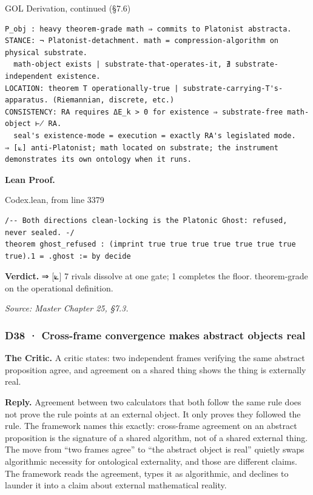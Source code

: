 \documentclass[10pt,twocolumn]{article}
\begin{document}
\begin{golbox}{GOL Derivation, continued (§7.6)}
\begin{lstlisting}[style=golv]
P_obj : heavy theorem-grade math ⇒ commits to Platonist abstracta.
STANCE: ¬ Platonist-detachment. math = compression-algorithm on physical substrate.
  math-object exists | substrate-that-operates-it, ∄ substrate-independent existence.
LOCATION: theorem T operationally-true | substrate-carrying-T's-apparatus. (Riemannian, discrete, etc.)
CONSISTENCY: RA requires ΔE_k > 0 for existence ⇒ substrate-free math-object ⊬ RA.
  seal's existence-mode = execution = exactly RA's legislated mode.
⇒ [⟀] anti-Platonist; math located on substrate; the instrument demonstrates its own ontology when it runs.
\end{lstlisting}
\end{golbox}

\textbf{Lean Proof.}

\begin{leanexcerpt}{Codex.lean, from line 3379}
\begin{lstlisting}[style=leanx,firstnumber=3379]
/-- Both directions clean-locking is the Platonic Ghost: refused, never sealed. -/
theorem ghost_refused : (imprint true true true true true true true true).1 = .ghost := by decide
\end{lstlisting}
\end{leanexcerpt}

\textbf{Verdict.} ⇒ {[}⟀{]} 7 rivals dissolve at one gate; 1 completes
the floor. theorem-grade on the operational definition.

\emph{Source: Master Chapter 25, §7.3.}

\hypertarget{d38-cross-frame-convergence-makes-abstract-objects-real}{%
\subsubsection{D38 · Cross-frame convergence makes abstract objects
real}\label{d38-cross-frame-convergence-makes-abstract-objects-real}}

\textbf{The Critic.} A critic states: two independent frames verifying
the same abstract proposition agree, and agreement on a shared thing
shows the thing is externally real.

\textbf{Reply.} Agreement between two calculators that both follow the
same rule does not prove the rule points at an external object. It only
proves they followed the rule. The framework names this exactly:
cross-frame agreement on an abstract proposition is the signature of a
shared algorithm, not of a shared external thing. The move from ``two
frames agree'' to ``the abstract object is real'' quietly swaps
algorithmic necessity for ontological externality, and those are
different claims. The framework reads the agreement, types it as
algorithmic, and declines to launder it into a claim about external
mathematical reality.
\end{document}
